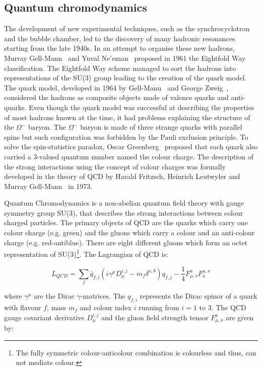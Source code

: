 \subsection{Quantum chromodynamics}\label{sec:Physics_SI_QCD}

The development of new experimental techniques, such as the synchrocyclotron and the bubble chamber, led to the discovery of many hadronic resonances starting from the late 1940s. In an attempt to organise these new hadrons, Murray Gell-Mann~\cite{EightFoldWay_1} and Yuval Ne'eman~\cite{EightFoldWay_2} proposed in 1961 the Eightfold Way classification. The Eightfold Way scheme managed to sort the hadrons into representations of the SU(3) group leading to the creation of the quark model. The quark model, developed in 1964 by Gell-Mann~\cite{QuarkModel_1} and George Zweig~\cite{QuarkModel_2}, considered the hadrons as composite objects made of valence quarks and anti-quarks. Even though the quark model was successful at describing the properties of most hadrons known at the time, it had problems explaining the structure of the $\Omega^{-}$ baryon. The $\Omega^{-}$ baryon is made of three strange quarks with parallel spins but such configuration was forbidden by the Pauli exclusion principle. To solve the spin-statistics paradox, Oscar Greenberg~\cite{ColourCharge} proposed that each quark also carried a 3-valued quantum number named the colour charge. The description of the strong interactions using the concept of colour charges was formally developed in the theory of QCD by Harald Fritzsch, Heinrich Leutwyler and Murray Gell-Mann~\cite{QCD} in 1973.

Quantum Chromodynamics is a non-abelian quantum field theory with gauge symmetry group SU(3), that describes the strong interactions between colour charged particles. The primary objects of QCD are the quarks which carry one colour charge (e.g. green) and the gluons which carry a colour and an anti-colour charge (e.g. red-antiblue). There are eight different gluons which form an octet representation of SU(3)\footnote{The fully symmetric colour-anticolour combination is colourless and thus, can not mediate colour.}. The Lagrangian of QCD is:

\begin{equation}
  L_{QCD} = \sum_{f}\bar{q}_{f,i}\left(i\gamma^{\mu}D_{\mu}^{i,j} - m_{f}\delta^{a,b}\right)q_{f,j} - \frac{1}{4}F^{a}_{\mu,\nu}F_{a}^{\mu,\nu}
  \label{eq:QCDLagrangian}
\end{equation}

where $\gamma^{\mu}$ are the Dirac $\gamma$-matrices. The $q_{f,i}$ represents the Dirac spinor of a quark with flavour $f$, mass $m_{f}$ and colour index $i$ running from $i=1$ to 3. The QCD gauge covariant derivative $D_{\mu}^{i,j}$ and the gluon field strength tensor $F^{a}_{\mu,\nu}$ are given by:

